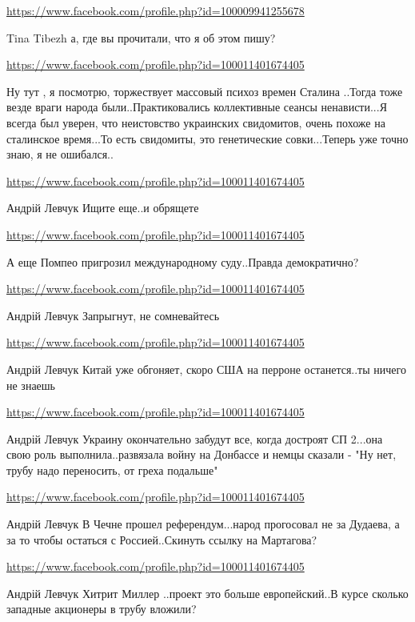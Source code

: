 \documentclass[a4paper,11pt]{extreport}
\begin{document}
\begin{itemize}
\begin{itemize}
\url{https://www.facebook.com/profile.php?id=100009941255678}

Tina Tibezh а, где вы прочитали, что я об этом пишу?

\end{itemize}
\url{https://www.facebook.com/profile.php?id=100011401674405}

Ну тут , я посмотрю, торжествует массовый психоз времен Сталина ..Тогда тоже везде враги народа были..Практиковались коллективные сеансы ненависти...Я всегда был уверен, что неистовство украинских свидомитов, очень похоже на сталинское время...То есть свидомиты, это генетические совки...Теперь уже точно знаю, я не ошибался..

\begin{itemize}
\url{https://www.facebook.com/profile.php?id=100011401674405}

Андрій Левчук Ищите еще..и обрящете🤣

\url{https://www.facebook.com/profile.php?id=100011401674405}

А еще Помпео пригрозил международному суду..Правда демократично?

\url{https://www.facebook.com/profile.php?id=100011401674405}

Андрій Левчук Запрыгнут, не сомневайтесь

\url{https://www.facebook.com/profile.php?id=100011401674405}

Андрій Левчук Китай уже обгоняет, скоро США на перроне останется..ты ничего не знаешь

\url{https://www.facebook.com/profile.php?id=100011401674405}

Андрій Левчук Украину окончательно забудут все, когда достроят СП 2...она свою роль выполнила..развязала войну на Донбассе и немцы сказали - "Ну нет, трубу надо переносить, от греха подальше"

\url{https://www.facebook.com/profile.php?id=100011401674405}

Андрій Левчук В Чечне прошел референдум...народ прогосовал не за Дудаева, а за то чтобы остаться с Россией..Скинуть ссылку на Мартагова?

\url{https://www.facebook.com/profile.php?id=100011401674405}

Андрій Левчук Хитрит Миллер ..проект это больше европейский..В курсе сколько западные акционеры в трубу вложили?


\end{itemize}
\end{itemize}
\end{document}
